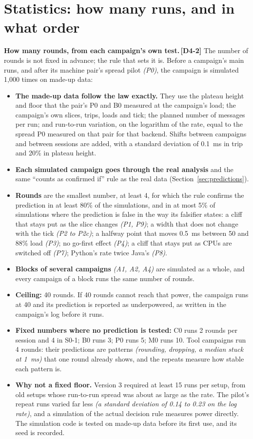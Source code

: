 \documentclass[11pt]{article}
\newcommand{\gl}[1]{{\color{soft}\itshape\small (#1)}}
\newcommand{\chgold}[1]{\,{\color{oldcol}\bfseries\footnotesize[#1]}}
\begin{document}
\section{Statistics: how many runs, and in what order}\label{sec:stats}

\textbf{How many rounds, from each campaign's own test.}\chgold{D4-2} The number of rounds is not fixed in advance; the rule that sets it is. Before a campaign's main runs, and after its machine pair's spread pilot \gl{P0}, the campaign is simulated 1,000 times on made-up data:
\begin{itemize}
  \item \textbf{The made-up data follow the law exactly.} They use the plateau height and floor that the pair's P0 and B0 measured at the campaign's load; the campaign's own slices, trips, loads and tick; the planned number of messages per run; and run-to-run variation, on the logarithm of the rate, equal to the spread P0 measured on that pair for that backend. Shifts between campaigns and between sessions are added, with a standard deviation of 0.1~ms in trip and 20\% in plateau height.
  \item \textbf{Each simulated campaign goes through the real analysis} and the same ``counts as confirmed if'' rule as the real data (Section~\ref{sec:predictions}).
  \item \textbf{Rounds} are the smallest number, at least 4, for which the rule confirms the prediction in at least 80\% of the simulations, and in at most 5\% of simulations where the prediction is false in the way its falsifier states: a cliff that stays put as the slice changes \gl{P1, P9}; a width that does not change with the tick \gl{P2 to P2c}; a halfway point that moves 0.5~ms between 50 and 88\% load \gl{P3}; no go-first effect \gl{P4}; a cliff that stays put as CPUs are switched off \gl{P7}; Python's rate twice Java's \gl{P8}.
  \item \textbf{Blocks of several campaigns} \gl{A1, A2, A4} are simulated as a whole, and every campaign of a block runs the same number of rounds.
  \item \textbf{Ceiling:} 40 rounds. If 40 rounds cannot reach that power, the campaign runs at 40 and its prediction is reported as underpowered, as written in the campaign's log before it runs.
  \item \textbf{Fixed numbers where no prediction is tested:} C0 runs 2 rounds per session and 4 in S0-1; B0 runs 3; P0 runs 5; M0 runs 10. Tool campaigns run 4 rounds: their predictions are patterns \gl{rounding, dropping, a median stuck at 1~ms} that one round already shows, and the repeats measure how stable each pattern is.
  \item \textbf{Why not a fixed floor.} Version 3 required at least 15 runs per setup, from old setups whose run-to-run spread was about as large as the rate. The pilot's repeat runs varied far less \gl{a standard deviation of 0.14 to 0.23 on the log rate}, and a simulation of the actual decision rule measures power directly. The simulation code is tested on made-up data before its first use, and its seed is recorded.
\end{itemize}
\end{document}
